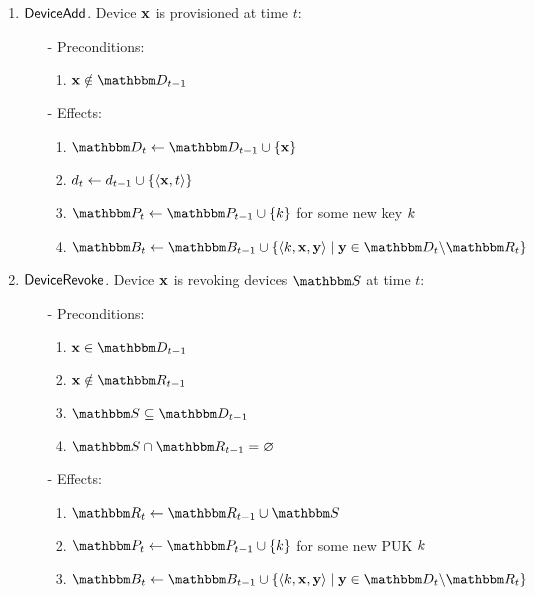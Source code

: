 \begin{definition}
\begin{enumerate}
\item $\mathsf{DeviceAdd}{}$. Device $\mathbf{x}$ is provisioned at time $t$:
 \begin{itemize}
   \item[-] Preconditions:
    \begin{enumerate}
     \item $\zdev{x} \notin \zset{d}_{t-1}$
    \end{enumerate}
   \item[-] Effects:
    \begin{enumerate}
      \item $\zset{d}_t \leftarrow \zset{d}_{t-1} \cup \left\{ \zdev{x} \right\}$
      \item $d_t \leftarrow d_{t-1} \cup \left\{ \langle \mathbf{x}, t \rangle \right\}$
      \item $\zset{P}_t \leftarrow \zset{p}_{t-1} \cup \left\{ \zkey{k} \right\}$ for some new key ${k}$
        \label{e:prov:newpuk}
        \item $\zset{b}_t \leftarrow \zset{b}_{t-1} \cup \left\{ \langle \zkey{k}, \zdev{x}, \zdev{y} \rangle \;|\; \zdev{y} \in \zset{d}_t \setsub \zset{r}_t \right\}$
          \label{e:prov:box}
    \end{enumerate}
 \end{itemize}
\item $\mathsf{DeviceRevoke}{}$. Device $\mathbf{x}$ is revoking devices $\zset{S}$ at 
    time $t$:
    \begin{itemize}
      \item[-] Preconditions:
      \begin{enumerate}
        \item $\zdev{x} \in \zset{d}_{t-1}$
        \item $\zdev{x} \notin \zset{r}_{t-1}$
        \item $\zset{s} \subseteq \zset{d}_{t-1}$
        \item $\zset{s} \cap \zset{r}_{t-1} = \varnothing$
      \end{enumerate}
      \item[-] Effects:
      \begin{enumerate}
        \item $\zset{r}_t \leftarrow \zset{r}_{t-1} \cup \zset{s}$
        \item $\zset{p}_{t} \leftarrow \zset{p}_{t-1} \cup \left\{ \zkey{k} \right\}$
                for some new PUK ${k}$
         \item $\zset{b}_t \leftarrow \zset{b}_{t-1} \cup \left\{ \langle \zkey{k}, \zdev{x}, \zdev{y} \rangle \;|\; \zdev{y} \in \zset{d}_t \setsub \zset{r}_t \right\}$

\end{enumerate}
\end{itemize}
\end{enumerate}
\end{definition}
